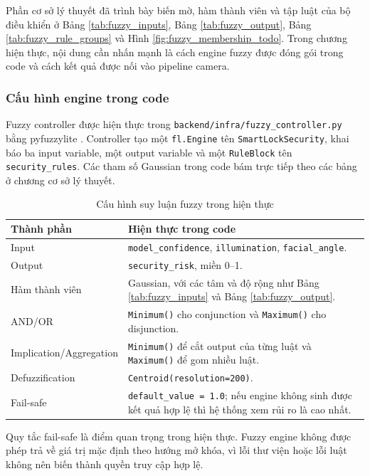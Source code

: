 Phần cơ sở lý thuyết đã trình bày biến mờ, hàm thành viên và tập luật của bộ điều khiển ở Bảng \ref{tab:fuzzy_inputs}, Bảng \ref{tab:fuzzy_output}, Bảng \ref{tab:fuzzy_rule_groups} và Hình \ref{fig:fuzzy_membership_todo}. Trong chương hiện thực, nội dung cần nhấn mạnh là cách engine fuzzy được đóng gói trong code và cách kết quả được nối vào pipeline camera.

\subsubsection{Cấu hình engine trong code}

Fuzzy controller được hiện thực trong \texttt{backend/infra/fuzzy\_controller.py} bằng pyfuzzylite \cite{fuzzylite}. Controller tạo một \texttt{fl.Engine} tên \texttt{SmartLockSecurity}, khai báo ba input variable, một output variable và một \texttt{RuleBlock} tên \texttt{security\_rules}. Các tham số Gaussian trong code bám trực tiếp theo các bảng ở chương cơ sở lý thuyết.

\begin{table}[H]
\centering
\caption{Cấu hình suy luận fuzzy trong hiện thực}
\label{tab:fuzzy_engine_impl}
\begin{tabularx}{\textwidth}{|l|X|}
\hline
\textbf{Thành phần} & \textbf{Hiện thực trong code} \\
\hline
Input & \texttt{model\_confidence}, \texttt{illumination}, \texttt{facial\_angle}. \\
\hline
Output & \texttt{security\_risk}, miền 0--1. \\
\hline
Hàm thành viên & Gaussian, với các tâm và độ rộng như Bảng \ref{tab:fuzzy_inputs} và Bảng \ref{tab:fuzzy_output}. \\
\hline
AND/OR & \texttt{Minimum()} cho conjunction và \texttt{Maximum()} cho disjunction. \\
\hline
Implication/Aggregation & \texttt{Minimum()} để cắt output của từng luật và \texttt{Maximum()} để gom nhiều luật. \\
\hline
Defuzzification & \texttt{Centroid(resolution=200)}. \\
\hline
Fail-safe & \texttt{default\_value = 1.0}; nếu engine không sinh được kết quả hợp lệ thì hệ thống xem rủi ro là cao nhất. \\
\hline
\end{tabularx}
\end{table}

Quy tắc fail-safe là điểm quan trọng trong hiện thực. Fuzzy engine không được phép trả về giá trị mặc định theo hướng mở khóa, vì lỗi thư viện hoặc lỗi luật không nên biến thành quyền truy cập hợp lệ.

